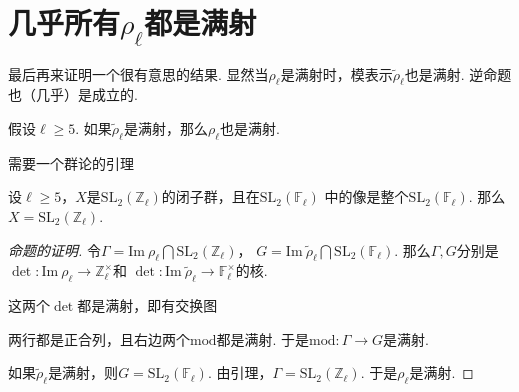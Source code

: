 \section{几乎所有\texorpdfstring{$\rho_{\ell}$}{rho ell}都是满射}

最后再来证明一个很有意思的结果.
显然当$\rho_{\ell}$是满射时，模表示$\tilde{\rho}_{\ell}$也是满射.
逆命题也（几乎）是成立的.

\begin{cprop}
    假设$\ell \geq 5$. 如果$\tilde{\rho}_{\ell}$是满射，那么$\rho_{\ell}$也是满射.
\end{cprop}

需要一个群论的引理
\begin{clem}
    设$\ell\geq 5$，$X$是$\mathrm{SL}_2(\mathbb{Z}_{\ell})$的闭子群，且在$\mathrm{SL}_2(\mathbb{F}_{\ell})$
    中的像是整个$\mathrm{SL}_2(\mathbb{F}_{\ell})$. 那么$X = \mathrm{SL}_2(\mathbb{Z}_{\ell})$.
\end{clem}

\begin{proof}[命题的证明]
    令$\Gamma = \mathrm{Im}\ \rho_{\ell}\bigcap \mathrm{SL}_2(\mathbb{Z}_{\ell})$，
    $G = \mathrm{Im}\ \tilde{\rho}_{\ell}\bigcap \mathrm{SL}_2(\mathbb{F}_{\ell})$.
    那么$\Gamma, G$分别是$\det: \mathrm{Im}\ \rho_{\ell} \to \mathbb{Z}_{\ell}^{\times}$和
    $\det: \mathrm{Im}\ \tilde{\rho}_{\ell}\to \mathbb{F}_{\ell}^{\times}$的核.

    这两个$\det$都是满射，即有交换图
    \begin{figure}[H]
        \centering
    \end{figure}
    两行都是正合列，且右边两个$\mathrm{mod}$都是满射.
    于是$\mathrm{mod}:\Gamma\to G$是满射.
    
    如果$\tilde{\rho}_{\ell}$是满射，则$G = \mathrm{SL}_2(\mathbb{F}_{\ell})$. 由引理，$\Gamma = \mathrm{SL}_2(\mathbb{Z}_{\ell})$. 于是$\rho_{\ell}$是满射.
\end{proof}
